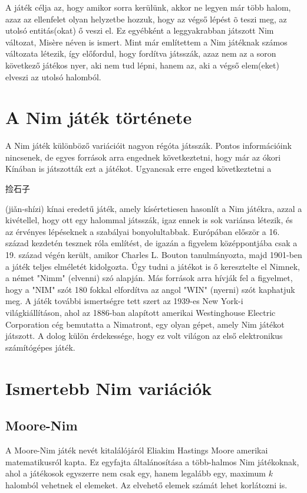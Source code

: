 A játék célja az, hogy amikor sorra kerülünk, akkor ne legyen már több halom, azaz az ellenfelet olyan helyzetbe hozzuk, hogy az végső lépést õ teszi meg, az utolsó entitás(okat) ő veszi el. Ez egyébként a leggyakrabban játszott Nim változat, Misère néven is ismert. Mint már említettem a Nim játéknak számos változata létezik, így előfordul, hogy fordítva játsszák, azaz nem az a soron következő játékos nyer, aki nem tud lépni, hanem az, aki a végső elem(eket) elveszi az utolsó halomból.\ujsor


\section{A Nim játék története}
A Nim játék különböző variációit nagyon régóta játsszák. Pontos információink nincsenek, de egyes források arra engednek következtetni, hogy már az ókori Kínában is játszották ezt a játékot. Ugyancsak erre enged következtetni a \begin{CJK*}{UTF8}{gbsn}捡石子\end{CJK*}
(jiǎn-shízi) kínai eredetű játék, amely kísértetiesen hasonlít a Nim játékra, azzal a kivétellel, hogy ott egy halommal játsszák, igaz ennek is sok variánsa létezik, és az érvényes lépéseknek a szabályai bonyolultabbak. \ujsor
Európában először a 16. század kezdetén tesznek róla említést, de igazán a figyelem középpontjába csak a 19. század végén került, amikor Charles L. Bouton tanulmányozta, majd 1901-ben a játék teljes elméletét kidolgozta. Úgy tudni a játékot is ő keresztelte el Nimnek, a német "Nimm" (elvenni) szó alapján. Más források arra hívják fel a figyelmet, hogy a "NIM" szót 180 fokkal elfordítva az angol "WIN" (nyerni) szót kaphatjuk meg. \ujsor
A játék további ismertségre tett szert az 1939-es New York-i világkiállításon, ahol az 1886-ban alapított amerikai Westinghouse Electric Corporation cég bemutatta a Nimatront, egy olyan gépet, amely Nim játékot játszott. A dolog külön érdekessége, hogy ez volt világon az első elektronikus számítógépes játék.

\section{Ismertebb Nim variációk}
\subsection{Moore-Nim}
A Moore-Nim játék nevét kitalálójáról Eliakim Hastings Moore amerikai matematikusról kapta. Ez egyfajta általánosítása a több-halmos Nim játékoknak, ahol a játékosok egyszerre nem csak egy, hanem legalább egy, maximum $k$ halomból vehetnek el elemeket. Az elvehető elemek számát lehet korlátozni is.

